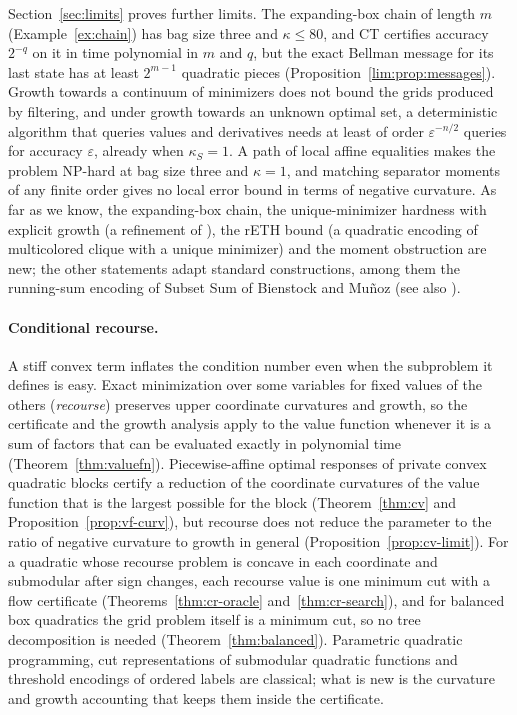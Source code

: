 Section~\ref{sec:limits} proves further limits. The expanding-box chain of
length $m$ (Example~\ref{ex:chain}) has bag size three and $\kappa\le80$, and
CT certifies accuracy $2^{-q}$ on it in time polynomial in $m$ and $q$, but
the exact Bellman message for its last state has at least $2^{m-1}$ quadratic
pieces
(Proposition~\ref{lim:prop:messages}). Growth towards a continuum of
minimizers does not bound the grids produced by filtering, and under growth
towards an unknown optimal set, a deterministic algorithm that queries values
and derivatives needs at least of order $\varepsilon^{-n/2}$ queries for
accuracy $\varepsilon$, already when $\kappa_S=1$. A path of local affine
equalities makes the problem NP-hard at bag size three and $\kappa=1$, and
matching separator moments of any finite order gives no local error bound in
terms of negative curvature. As far as we know, the expanding-box chain, the
unique-minimizer hardness with explicit growth (a refinement of
\cite[Remark~2]{DelPiaKhajavirad2026}), the rETH bound (a quadratic encoding of multicolored clique
with a unique minimizer) and the moment obstruction are new; the other statements adapt
standard constructions, among them the running-sum encoding of Subset Sum of
Bienstock and Mu\~noz \cite[Appendix~A]{BienstockMunoz2018} (see also
\cite[Example~1.1]{CifuentesParrilo2016}).

\paragraph{Conditional recourse.}
A stiff convex term inflates the condition number even when the subproblem
it defines is easy. Exact minimization over some variables for fixed values
of the others (\emph{recourse}) preserves upper coordinate curvatures and
growth, so the certificate and the growth analysis apply to the value
function whenever it is a sum of factors that can be evaluated exactly in
polynomial time (Theorem~\ref{thm:valuefn}). Piecewise-affine optimal
responses of private convex quadratic blocks certify a reduction of the
coordinate curvatures of the value function that is the largest possible for
the block (Theorem~\ref{thm:cv} and Proposition~\ref{prop:vf-curv}), but
recourse does not reduce the parameter to the ratio of negative curvature to
growth in general (Proposition~\ref{prop:cv-limit}). For a quadratic whose recourse
problem is concave in each coordinate and submodular after sign changes, each
recourse value is one minimum cut with a flow certificate
(Theorems~\ref{thm:cr-oracle} and~\ref{thm:cr-search}), and for balanced box
quadratics the grid problem itself is a minimum cut, so no tree decomposition
is needed (Theorem~\ref{thm:balanced}). Parametric quadratic programming, cut
representations of submodular quadratic functions and threshold encodings of
ordered labels are classical; what is new is the curvature and growth
accounting that keeps them inside the certificate.

